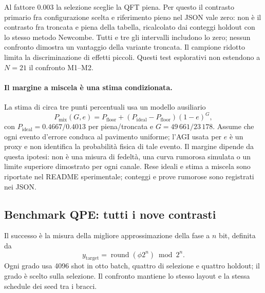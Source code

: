 Al fattore 0.003 la selezione sceglie la QFT piena. Per questo il
contrasto primario fra configurazione scelta e riferimento pieno
nel JSON vale zero: non è il contrasto fra troncata e piena della
tabella, ricalcolato dai conteggi holdout con lo stesso metodo Newcombe.
Tutti e tre gli intervalli includono lo zero; nessun confronto dimostra
un vantaggio della variante troncata. Il campione ridotto limita la
discriminazione di effetti piccoli. Questi test esplorativi non
estendono a $N=21$ il confronto M1--M2.

\paragraph{Il margine a miscela è una stima condizionata.}
La stima di circa tre punti percentuali usa un modello ausiliario
\begin{equation}
 P_{\mathrm{mix}}(G,e)=P_{\mathrm{floor}}+
 (P_{\mathrm{ideal}}-P_{\mathrm{floor}})(1-e)^G,
 \label{eq:aqft_miscela}
\end{equation}
con $P_{\mathrm{ideal}}=0.4667/0.4013$ per piena/troncata e
$G=49\,661/23\,178$. Assume che ogni evento d'errore conduca al
pavimento uniforme; l'AGI usata per $e$ è un proxy e non identifica la
probabilità fisica di tale evento. Il margine dipende da questa ipotesi:
non è una misura di fedeltà, una curva rumorosa simulata o un limite
superiore dimostrato per ogni canale. Rese ideali e stima a miscela
sono riportate nel README sperimentale; conteggi e prove rumorose
sono registrati nei JSON.

\subsection{Benchmark QPE: tutti i nove contrasti}

Il successo è la misura della migliore approssimazione della fase a
$n$ bit, definita da
\begin{equation}
 y_{\mathrm{target}}=\operatorname{round}(\phi 2^n)\bmod 2^n.
 \label{eq:aqft_qpe_target}
\end{equation}
Ogni grado usa 4096 shot in otto batch, quattro di selezione e quattro
holdout; il grado è scelto sulla selezione. Il confronto mantiene lo
stesso layout e la stessa schedule dei seed tra i bracci.

